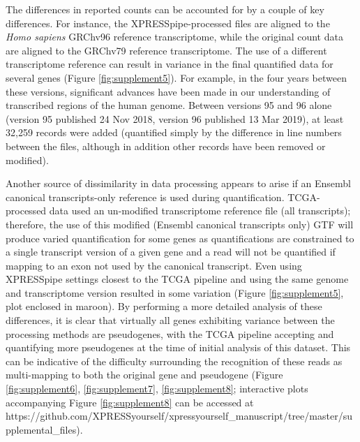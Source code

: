 \documentclass[10pt, oneside]{article}
\begin{document}
The differences in reported counts can be accounted for by a couple of key differences. For instance, the XPRESSpipe-processed files are aligned to the \textit{Homo sapiens} GRChv96 reference transcriptome, while the original count data are aligned to the GRChv79 reference transcriptome. The use of a different transcriptome reference can result in variance in the final quantified data for several genes (Figure \ref{fig:supplement5}). For example, in the four years between these versions, significant advances have been made in our understanding of transcribed regions of the human genome. Between versions 95 and 96 alone (version 95 published 24 Nov 2018, version 96 published 13 Mar 2019), at least 32,259 records were added (quantified simply by the difference in line numbers between the files, although in addition other records have been removed or modified). \par

Another source of dissimilarity in data processing appears to arise if an Ensembl canonical transcripts-only reference is used during quantification. TCGA-processed data used an un-modified transcriptome reference file (all transcripts); therefore, the use of this modified (Ensembl canonical transcripts only) GTF will produce varied quantification for some genes as quantifications are constrained to a single transcript version of a given gene and a read will not be quantified if mapping to an exon not used by the canonical transcript. Even using XPRESSpipe settings closest to the TCGA pipeline and using the same genome and transcriptome version resulted in some variation (Figure \ref{fig:supplement5}, plot enclosed in maroon). By performing a more detailed analysis of these differences, it is clear that virtually all genes exhibiting variance between the processing methods are pseudogenes, with the TCGA pipeline accepting and quantifying more pseudogenes at the time of initial analysis of this dataset. This can be indicative of the difficulty surrounding the recognition of these reads as multi-mapping to both the original gene and pseudogene (Figure \ref{fig:supplement6}, \ref{fig:supplement7}, \ref{fig:supplement8}; interactive plots accompanying Figure \ref{fig:supplement8} can be accessed at https://github.com/XPRESSyourself/xpressyourself\_manuscript/tree/master/supplemental\_files). \par
\end{document}
